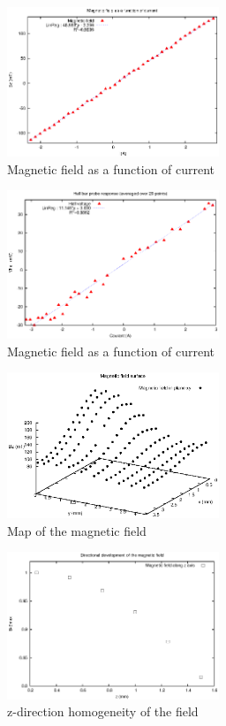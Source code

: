 \documentclass[journal]{IEEEtran}
\begin{document}
\begin{figure}[h]
\centering
\includegraphics[width=2.5in]{champ_fonction_courant.eps}
\caption{Magnetic field as a function of current}
\label{fig:linear_gauss}
\end{figure}



\begin{figure}[h]
\centering

\includegraphics[width=2.5in]{rampe_courant_20.eps}
\caption{Magnetic field as a function of current}
\label{fig:linear_hall_20}
\end{figure}

\begin{figure}[h]
\centering

\includegraphics[width=2.5in]{cartographie_champ.eps}
\caption{Map of the magnetic field}
\label{fig:map}
\end{figure}

\begin{figure}[h]
\centering

\includegraphics[width=2.5in]{cartographie_champ_z.eps}
\caption{z-direction homogeneity of the field}
\label{fig:homo_z}
\end{figure}
\end{document}
